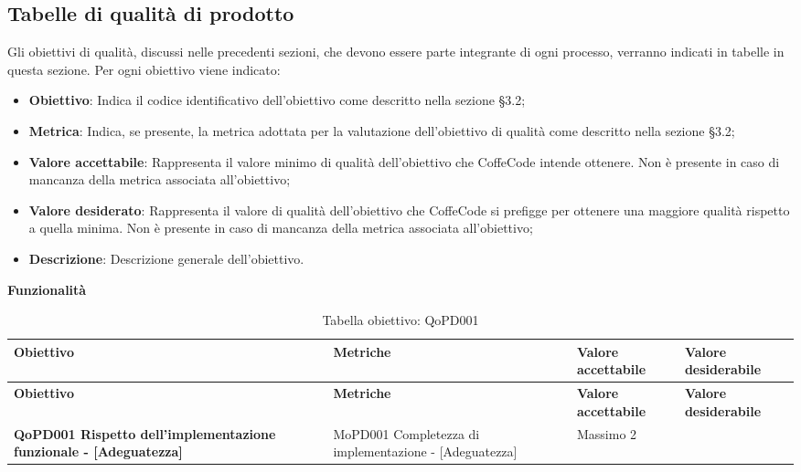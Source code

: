 \documentclass[../piano-di-qualifica.tex]{subfiles}
\begin{document}
\subsection{Tabelle di qualità di prodotto}
\label{sub:tabelle_di_qualita_di_prodotto}
Gli obiettivi di qualità, discussi nelle precedenti sezioni, che devono essere parte integrante di ogni processo, verranno indicati in tabelle in questa sezione.
Per ogni obiettivo viene indicato:

\begin{itemize}
   \item \textbf{Obiettivo}: Indica il codice identificativo dell'obiettivo come descritto nella sezione §3.2;
   \item \textbf{Metrica}: Indica, se presente, la metrica adottata per la valutazione dell'obiettivo di qualità come descritto nella sezione §3.2;
   \item \textbf{Valore accettabile}: Rappresenta il valore minimo di qualità dell'obiettivo che CoffeCode intende ottenere. Non è presente in caso di mancanza della metrica associata all'obiettivo;
   \item \textbf{Valore desiderato}: Rappresenta il valore di qualità dell'obiettivo che CoffeCode si prefigge per ottenere una maggiore qualità rispetto a quella minima. Non è presente in caso di mancanza della metrica associata all'obiettivo;
   \item \textbf{Descrizione}: Descrizione generale dell'obiettivo.
\end{itemize}

\begin{center}
    \centering
    \textbf{Funzionalità}
\end{center}

\renewcommand{\arraystretch}{2} %
\begin{longtable}[H]{>{\centering\bfseries}m{5cm} >{\centering}m{5cm} >{\centering}m{2.5cm} >{\centering\arraybackslash}m{2.5cm}}  
    \caption{Tabella obiettivo: QoPD001}%
    \label{tab:obiettivo_qopd001} \\
  \rowcolor{lightgray}
  {\textbf{Obiettivo}} & {\textbf{Metriche}} & {\textbf{Valore accettabile}} & {\textbf{Valore desiderabile}}  \\
  \endfirsthead%
  \rowcolor{lightgray}
  {\textbf{Obiettivo}} & {\textbf{Metriche}} & {\textbf{Valore accettabile}} & {\textbf{Valore desiderabile}}  \\
  \endhead%
  \textbf{QoPD001 Rispetto dell’implementazione funzionale - {[}Adeguatezza{]}} & MoPD001 Completezza di implementazione - {[}Adeguatezza{]} & Massimo 2 & 0 \\
\end{longtable}
\end{document}
